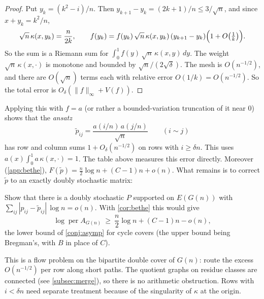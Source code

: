 \begin{proof}
Put $y_k=(k^2-i)/n$. Then $y_{k+1}-y_k=(2k+1)/n\le 3/\sqrt n$, and since
$x+y_k=k^2/n$,
\[
\sqrt n\,\kappa(x,y_k)=\frac{n}{2k},\qquad
f(y_k)=f(y_k)\,\sqrt n\,\kappa(x,y_k)\,(y_{k+1}-y_k)\Bigl(1+O\bigl(\tfrac1k\bigr)\Bigr).
\]
So the sum is a Riemann sum for $\int_0^1 f(y)\,\sqrt n\,\kappa(x,y)\,dy$. The weight $\sqrt n\,\kappa(x,\cdot)$ is
monotone and bounded by $\sqrt n/(2\sqrt\delta)$. The mesh is $O(n^{-1/2})$, and there are
$O(\sqrt n)$ terms each with relative error $O(1/k)=O(n^{-1/2})$. So the total error is
$O_\delta(\|f\|_\infty+V(f))$.
\end{proof}

Applying this with $f=a$ (or rather a bounded-variation truncation of it near $0$) shows
that the \emph{ansatz}
\begin{equation}\label{eq:ansatz}
\widetilde p_{ij}=\frac{a(i/n)\,a(j/n)}{\sqrt n}\qquad(i\sim j)
\end{equation}
has row and column sums $1+O_\delta(n^{-1/2})$ on rows with $i\ge\delta n$. This uses
$a(x)\int_0^1 a\,\kappa(x,\cdot)=1$. The table above measures this error directly.
Moreover (\cref{app:bethe}),
$F(\widetilde p)=\frac n2\log n+(C-1)n+o(n)$. What remains is to correct $\widetilde p$
to an exactly doubly stochastic matrix:

\begin{problem}[L1]\label{prob:L1}
Show that there is a doubly stochastic $P$ supported on $E(G(n))$ with
$\sum_{ij}|p_{ij}-\widetilde p_{ij}|\,\log n=o(n)$. With \cref{cor:bethe} this would give
\[
\log\operatorname{per}A_{G(n)}\ \ge\ \frac n2\log n+(C-1)n-o(n),
\]
the lower bound of \cref{conj:asymp} for cycle covers (the upper bound being Bregman's,
with $B$ in place of $C$).
\end{problem}

This is a flow problem on the bipartite double cover of $G(n)$: route the excess
$O(n^{-1/2})$ per row along short paths. The quotient graphs on residue classes are
connected (see \cref{subsec:merge}), so there is no arithmetic obstruction. Rows with
$i<\delta n$ need separate treatment because of the singularity of $\kappa$ at the origin.

